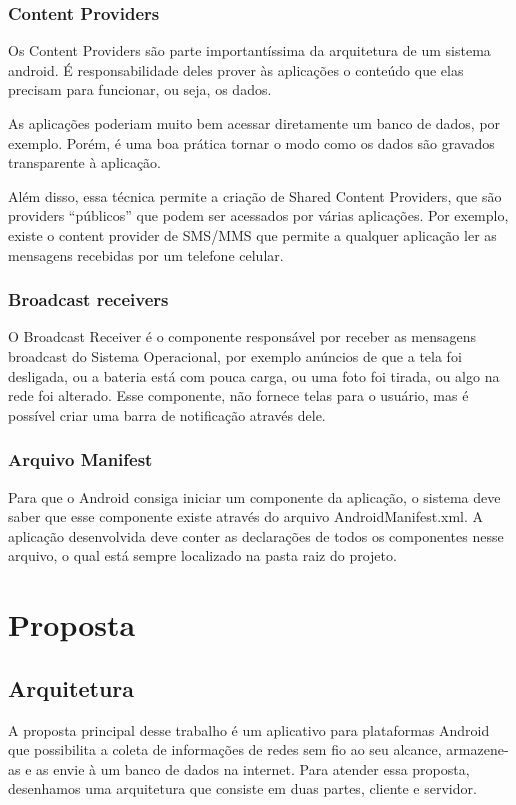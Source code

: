 \documentclass[12pt, %
openright, 
oneside,
a4paper,
brazil]{facom-ufu-abntex2}
\begin{document}
	\subsection{Content Providers}
	Os Content Providers são parte importantíssima da arquitetura de um sistema android. É responsabilidade deles prover às aplicações o conteúdo que elas precisam para funcionar, ou seja, os dados.

As aplicações poderiam muito bem acessar diretamente um banco de dados, por exemplo. Porém, é uma boa prática tornar o modo como os dados são gravados transparente à aplicação. 

Além disso, essa técnica permite a criação de Shared Content Providers, que são providers “públicos” que podem ser acessados por várias aplicações. Por exemplo, existe o content provider de SMS/MMS que permite a qualquer aplicação ler as mensagens recebidas por um telefone celular.

	\subsection{Broadcast receivers}
	O Broadcast Receiver é o componente responsável por receber as mensagens broadcast do Sistema Operacional, por exemplo anúncios de que a tela foi desligada, ou a bateria está com pouca carga, ou uma foto foi tirada, ou algo na rede foi alterado. Esse componente, não fornece telas para o usuário, mas é possível criar uma barra de notificação através dele.

	\subsection{Arquivo Manifest}
	Para que o Android consiga iniciar um componente da aplicação, o sistema deve saber que esse componente existe através do arquivo AndroidManifest.xml. A aplicação desenvolvida deve conter as declarações de todos os componentes nesse arquivo, o qual está sempre localizado na pasta raiz do projeto.		


\chapter{Proposta}


\section{Arquitetura}
A proposta principal desse trabalho é um aplicativo para plataformas Android que possibilita a coleta de informações de redes sem fio ao seu alcance, armazene-as e as envie à um banco de dados na internet. Para atender essa proposta, desenhamos uma arquitetura que consiste em duas partes, cliente e servidor.
\end{document}
